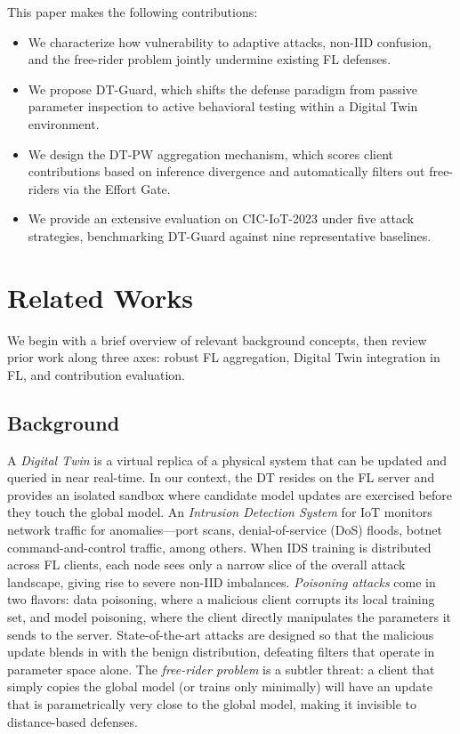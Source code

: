 \documentclass[conference]{IEEEtran}
\begin{document}
    This paper makes the following contributions:
    \begin{itemize}
        \item We characterize how vulnerability to adaptive attacks, non-IID confusion, and the free-rider problem jointly undermine existing FL defenses.
        \item We propose DT-Guard, which shifts the defense paradigm from passive parameter inspection to active behavioral testing within a Digital Twin environment.
        \item We design the DT-PW aggregation mechanism, which scores client contributions based on inference divergence and automatically filters out free-riders via the Effort Gate.
        \item We provide an extensive evaluation on CIC-IoT-2023 under five attack strategies, benchmarking DT-Guard against nine representative baselines.
    \end{itemize}
    
    
    \section{Related Works}
    
    We begin with a brief overview of relevant background concepts, then review prior work along three axes: robust FL aggregation, Digital Twin integration in FL, and contribution evaluation.
    
    \subsection{Background}
    
    A \emph{Digital Twin} is a virtual replica of a physical system that can be updated and queried in near real-time. In our context, the DT resides on the FL server and provides an isolated sandbox where candidate model updates are exercised before they touch the global model. An \emph{Intrusion Detection System} for IoT monitors network traffic for anomalies---port scans, denial-of-service (DoS) floods, botnet command-and-control traffic, among others. When IDS training is distributed across FL clients, each node sees only a narrow slice of the overall attack landscape, giving rise to severe non-IID imbalances. \emph{Poisoning attacks} come in two flavors: data poisoning, where a malicious client corrupts its local training set, and model poisoning, where the client directly manipulates the parameters it sends to the server. State-of-the-art attacks are designed so that the malicious update blends in with the benign distribution, defeating filters that operate in parameter space alone. The \emph{free-rider problem} is a subtler threat: a client that simply copies the global model (or trains only minimally) will have an update that is parametrically very close to the global model, making it invisible to distance-based defenses.
    
\end{document}
